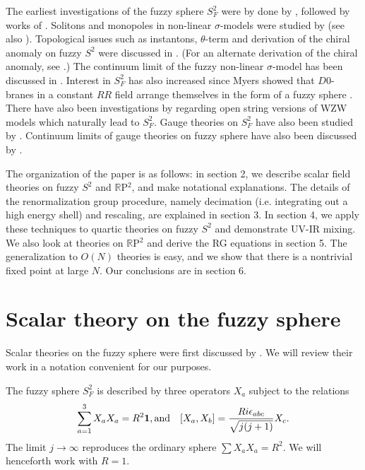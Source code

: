 \documentclass[a4paper,12pt]{article}
\numberwithin{equation}{section}
\begin{document}
The earliest investigations of the fuzzy sphere $S^2_F$ were by done
by \cite{madore}, followed by works of \cite{gkp1,gkp2}. Solitons and
monopoles in non-linear $\sigma$-models were studied by \cite{bbvy}
(see also \cite{gkp3}). Topological issues such as instantons,
$\theta$-term and derivation of the chiral anomaly on fuzzy $S^2$ were
discussed in \cite{balvai}. (For an alternate derivation of the chiral
anomaly, see \cite{presnajder}.) The continuum limit of the fuzzy
non-linear $\sigma$-model has been discussed in
\cite{bamaoc}. Interest in $S^2_F$ has also increased since Myers
showed that $D0$-branes in a constant $RR$ field arrange themselves in
the form of a fuzzy sphere \cite{myers}. There have also been
investigations by \cite{alresc} regarding open string versions of WZW
models which naturally lead to $S_F^2$. Gauge theories on $S_F^2$ have
also been studied by \cite{klimcik,watamura}. Continuum limits of
gauge theories on fuzzy sphere have also been discussed by
\cite{iktw}.

The organization of the paper is as follows: in section 2, we describe
scalar field theories on fuzzy $S^2$ and ${\mathbb R}$P$^2$, and make
notational explanations. The details of the renormalization group
procedure, namely decimation (i.e. integrating out a high energy
shell) and rescaling, are explained in section 3. In section 4, we
apply these techniques to quartic theories on fuzzy $S^2$ and
demonstrate UV-IR mixing. We also look at theories on ${\mathbb
R}$P$^2$ and derive the RG equations in section 5. The generalization
to $O(N)$ theories is easy, and we show that there is a nontrivial
fixed point at large $N$. Our conclusions are in section 6.

\section{Scalar theory on the fuzzy sphere}

Scalar theories on the fuzzy sphere were first discussed by
\cite{gkp1,gkp2}. We will review their work in a notation convenient
for our purposes.
 
The fuzzy sphere $S_F^2$ is described by three operators $X_a$
subject to the relations 
\begin{equation}
\sum_{a=1}^3 X_a X_a = R^2 {\bf 1}, \text{and} \quad [X_a, X_b] =
\frac{R i \epsilon_{abc}}{\sqrt{j(j+1)}}X_c.
\end{equation} 
The limit $j \rightarrow \infty$ reproduces the ordinary sphere
$\sum X_a X_a = R^2$. We will henceforth work with $R=1$.
\end{document}
